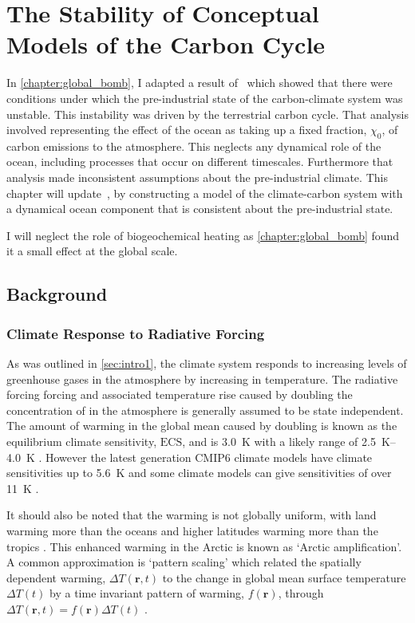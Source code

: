 \chapter{The Stability of Conceptual Models of the Carbon Cycle}
\label{chapter:conceptual_carbon_cycle}
\graphicspath{{box_ocean/figs/}}

In \cref{chapter:global_bomb}, I adapted a result of~\cite{Cox2006} which showed that there were conditions under which the pre-industrial state of the carbon-climate
system was unstable. This instability was driven by the terrestrial carbon cycle. That analysis involved representing the effect of the ocean as taking up a fixed fraction,
$\chi_0$, of carbon emissions to the atmosphere. This neglects any dynamical role of the ocean, including processes that occur on different timescales. Furthermore that analysis
made inconsistent assumptions about the pre-industrial climate. This chapter will update~\cite{Cox2006}, by constructing a model of the climate-carbon system with a dynamical ocean component
that is consistent about the pre-industrial state.

I will neglect the role of biogeochemical heating as \cref{chapter:global_bomb} found it a small effect at the global scale.

\section{Background}

\subsection{Climate Response to Radiative Forcing}
As was outlined in \cref{sec:intro1}, the climate system responds to increasing levels of greenhouse gases in the atmosphere by increasing in temperature. The radiative forcing
forcing and associated temperature rise caused by doubling the concentration of  in the atmosphere is generally assumed to be state independent. The amount of warming
in the global mean caused by doubling  is known as the equilibrium climate sensitivity, $\mathrm{ECS}$, and is
\SI{3.0}{\kelvin} with a likely range of \SIrange{2.5}{4.0}{\kelvin} \parencite{AR6,Sherwood2020}.
However the latest generation CMIP6 climate models have climate sensitivities up to \SI{5.6}{\kelvin} \parencite{Zelinka2020} and some climate models can give sensitivities of over
\SI{11}{\kelvin} \parencite{Stainforth2005}.

It should also be noted that the warming is not globally uniform, with land warming more than the oceans \parencite{Morice2021} and higher latitudes warming more than the tropics \parencite{Serreze2011}.
This enhanced warming in the Arctic is known as `Arctic amplification'. A common approximation is `pattern scaling' which related the spatially dependent warming, $\Delta T(\bm{r},t)$
to the change in global mean surface temperature $\Delta T(t)$ by a time invariant pattern of warming, $f(\bm{r})$,
through $\Delta T(\bm{r},t) = f(\bm{r}) \Delta T(t)$ \parencite{Huntingford2000a}.



